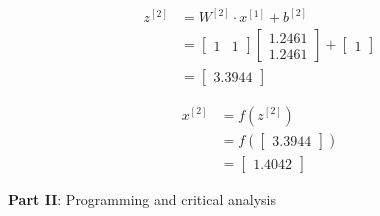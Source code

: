 \documentclass[12pt]{article}
\begin{document}
\begin{enumerate}[leftmargin=\labelsep]
\begin{paracol}{3}
              $$
                  \begin{aligned}
                      z^{[2]} & = W^{[2]} \cdot x^{[1]} + b^{[2]} \\
                              & = \begin{bmatrix}
                                      1 &
                                      1
                                  \end{bmatrix}
                      \begin{bmatrix}
                          1.2461 \\
                          1.2461
                      \end{bmatrix}
                      +
                      \begin{bmatrix}
                          1
                      \end{bmatrix}                              \\
                              & = \begin{bmatrix}{}
                                      3.3944
                                  \end{bmatrix}
                  \end{aligned}
              $$

              $$
                  \begin{aligned}
                      x^{[2]} & = f(z^{[2]})                  \\
                              & = f\left(\begin{bmatrix}{}
                                                 3.3944
                                             \end{bmatrix}\right) \\
                              & = \begin{bmatrix}{}
                                      1.4042
                                  \end{bmatrix}
                  \end{aligned}
              $$

          \end{paracol}

\end{enumerate}

\pagebreak

\begin{center}
    \large{\textbf{Part II}: Programming and critical analysis}
\end{center}
\end{document}
